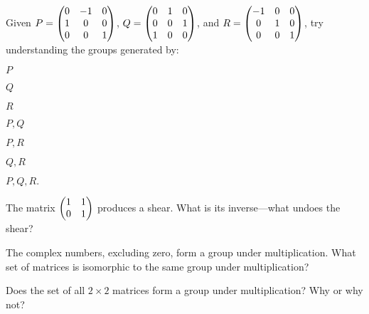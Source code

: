 \documentclass[../gatm_answers.tex]{subfiles}
\begin{document}
\begin{outer_problem}
\item Given $P=\begin{pmatrix} 0 & -1 & 0 \\ 1 & 0 & 0 \\ 0 & 0 & 1 \end{pmatrix}$, $Q=\begin{pmatrix} 0 & 1 & 0 \\ 0 & 0 & 1 \\ 1 & 0 & 0 \end{pmatrix}$, and $R=\begin{pmatrix} -1 & 0 & 0 \\ 0 & 1 & 0 \\ 0 & 0 & 1 \end{pmatrix}$, try understanding the groups generated by:
\end{outer_problem}

\begin{inner_problem}[start=1]
\item ${P}$
\end{inner_problem}

\begin{inner_problem}
\item ${Q}$
\end{inner_problem}

\begin{inner_problem}
\item ${R}$
\end{inner_problem}

\begin{inner_problem}
\item ${P,Q}$
\end{inner_problem}

\begin{inner_problem}
\item ${P,R}$
\end{inner_problem}

\begin{inner_problem}
\item ${Q,R}$
\end{inner_problem}

\begin{inner_problem}
\item ${P,Q,R}.$
\end{inner_problem}

\begin{outer_problem}
\item The matrix $\begin{pmatrix} 1 & 1 \\ 0 & 1 \end{pmatrix}$ produces a shear. What is its inverse---what undoes the shear?
\end{outer_problem}

\begin{outer_problem}
\item The complex numbers, excluding zero, form a group under multiplication. What set of matrices is isomorphic to the same group under multiplication?
\end{outer_problem}

\begin{outer_problem}
\item Does the set of all $2\times 2$ matrices form a group under multiplication? Why or why not?
\end{outer_problem}
\end{document}
